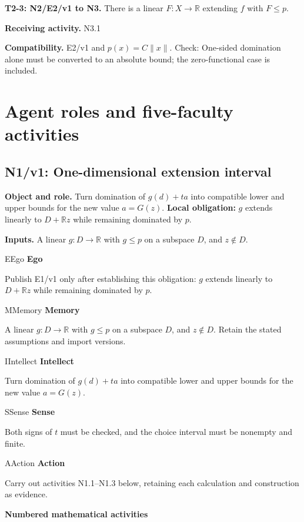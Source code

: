 \documentclass[preprint,12pt,aps,pra,showkeys,amsmath,amssymb,superscriptaddress,floatfix]{revtex4-2}
\theoremstyle{definition}
\theoremstyle{remark}
\newcommand{\mmfaculty}[3]{%
 \begin{mmfacultybox}{#1}{#2}
 {\sffamily\bfseries\color{MMBlue}#2}\par\smallskip #3
 \end{mmfacultybox}}
\newcommand{\field}[2]{\par\smallskip\noindent\textbf{#1.} #2\par}
\begin{document}
\field{T2-3: N2/E2/v1 to N3}{There is a linear \(F:X\to\mathbb R\) extending \(f\) with \(F\le p\).}

\field{Receiving activity}{N3.1}

\field{Compatibility}{E2/v1 and \(p(x)=C\|x\|\). Check: One-sided domination alone must be
converted to an absolute bound; the zero-functional case is included.}

\endgroup

\clearpage\section{Agent roles and five-faculty activities}\begingroup\small\linespread{1.05}\selectfont{}

\begingroup\footnotesize\linespread{1.05}\selectfont\let\small\footnotesize

\subsection{N1/v1: One-dimensional extension interval}

\field{Object and role}{Turn domination of \(g(d)+ta\) into compatible lower and upper bounds
for the new value \(a=G(z)\). \textbf{Local obligation:} \(g\) extends
linearly to \(D+\mathbb Rz\) while remaining dominated by \(p\).}

\field{Inputs}{A linear \(g:D\to\mathbb R\) with \(g\le p\) on a subspace \(D\), and
\(z\notin D\).}

\mmfaculty{E}{Ego}{Publish E1/v1 only after establishing this obligation: \(g\) extends
linearly to \(D+\mathbb Rz\) while remaining dominated by \(p\).}

\mmfaculty{M}{Memory}{A linear \(g:D\to\mathbb R\) with \(g\le p\) on a subspace \(D\), and
\(z\notin D\). Retain the stated assumptions and import versions.}

\mmfaculty{I}{Intellect}{Turn domination of \(g(d)+ta\) into compatible lower and upper bounds
for the new value \(a=G(z)\).}

\mmfaculty{S}{Sense}{Both signs of \(t\) must be checked, and the choice interval must be
nonempty and finite.}

\mmfaculty{A}{Action}{Carry out activities N1.1--N1.3 below, retaining each calculation and
construction as evidence.}

\smallskip\noindent\textbf{Numbered mathematical activities}
\end{document}
